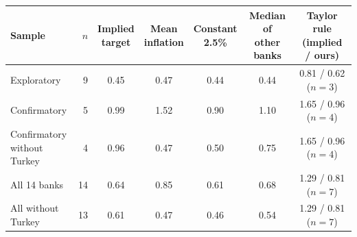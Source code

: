 \begin{tabular}{lrccccc}\toprule
Sample & $n$ & \hd{Implied\\target} & \hd{Mean\\inflation} & \hd{Constant\\2.5\%} & \hd{Median of\\other banks} & \hd{Taylor rule\\(implied / ours)}\\\midrule
Exploratory & 9 & 0.45 & 0.47 & 0.44 & 0.44 & \hd{0.81 / 0.62\\($n=3$)}\\
Confirmatory & 5 & 0.99 & 1.52 & 0.90 & 1.10 & \hd{1.65 / 0.96\\($n=4$)}\\
\hd{Confirmatory\\without Turkey} & 4 & 0.96 & 0.47 & 0.50 & 0.75 & \hd{1.65 / 0.96\\($n=4$)}\\
All 14 banks & 14 & 0.64 & 0.85 & 0.61 & 0.68 & \hd{1.29 / 0.81\\($n=7$)}\\
\hd{All without\\Turkey} & 13 & 0.61 & 0.47 & 0.46 & 0.54 & \hd{1.29 / 0.81\\($n=7$)}\\
\bottomrule\end{tabular}